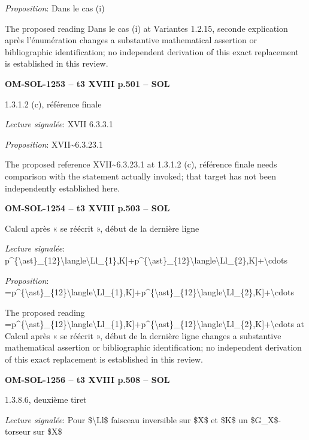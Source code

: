 \emph{Proposition}: Dans le cas (i)\par
The proposed reading Dans le cas (i) at Variantes 1.2.15, seconde explication après l'énumération changes a substantive mathematical assertion or bibliographic identification; no independent derivation of this exact replacement is established in this review.\par
\par\noindent\textbf{OM-SOL-1253 -- t3 XVIII p.501 -- SOL}\par
1.3.1.2 (c), référence finale\par
\emph{Lecture signalée}: XVII 6.3.3.1\par
\emph{Proposition}: XVII\textasciitilde{}6.3.23.1\par
The proposed reference XVII\textasciitilde{}6.3.23.1 at 1.3.1.2 (c), référence finale needs comparison with the statement actually invoked; that target has not been independently established here.\par
\par\noindent\textbf{OM-SOL-1254 -- t3 XVIII p.503 -- SOL}\par
Calcul après « se réécrit », début de la dernière ligne\par
\emph{Lecture signalée}: p\textasciicircum{}\{\textbackslash{}ast\}\_\{12\}\textbackslash{}langle\textbackslash{}Ll\_\{1\},K]+p\textasciicircum{}\{\textbackslash{}ast\}\_\{12\}\textbackslash{}langle\textbackslash{}Ll\_\{2\},K]+\textbackslash{}cdots\par
\emph{Proposition}: =\allowbreak p\textasciicircum{}\{\textbackslash{}ast\}\_\{12\}\textbackslash{}langle\textbackslash{}Ll\_\{1\},K]+p\textasciicircum{}\{\textbackslash{}ast\}\_\{12\}\textbackslash{}langle\textbackslash{}Ll\_\{2\},K]+\textbackslash{}cdots\par
The proposed reading =\allowbreak p\textasciicircum{}\{\textbackslash{}ast\}\_\{12\}\textbackslash{}langle\textbackslash{}Ll\_\{1\},K]+p\textasciicircum{}\{\textbackslash{}ast\}\_\{12\}\textbackslash{}langle\textbackslash{}Ll\_\{2\},K]+\textbackslash{}cdots at Calcul après « se réécrit », début de la dernière ligne changes a substantive mathematical assertion or bibliographic identification; no independent derivation of this exact replacement is established in this review.\par
\par\noindent\textbf{OM-SOL-1256 -- t3 XVIII p.508 -- SOL}\par
1.3.8.6, deuxième tiret\par
\emph{Lecture signalée}: Pour \$\textbackslash{}Ll\$ faisceau inversible sur \$X\$ et \$K\$ un \$G\_X\$-torseur sur \$X\$\par
